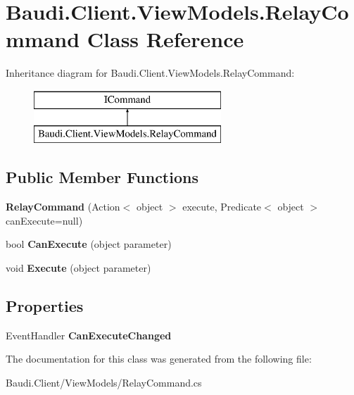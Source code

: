 \hypertarget{class_baudi_1_1_client_1_1_view_models_1_1_relay_command}{}\section{Baudi.\+Client.\+View\+Models.\+Relay\+Command Class Reference}
\label{class_baudi_1_1_client_1_1_view_models_1_1_relay_command}
Inheritance diagram for Baudi.\+Client.\+View\+Models.\+Relay\+Command\+:\begin{figure}[H]
\begin{center}
\leavevmode
\includegraphics[height=2.000000cm]{class_baudi_1_1_client_1_1_view_models_1_1_relay_command}
\end{center}
\end{figure}
\subsection*{Public Member Functions}
\begin{DoxyCompactItemize}
\item 
\hypertarget{class_baudi_1_1_client_1_1_view_models_1_1_relay_command_a3f9ea633fcd312f59116b5c8e725c51b}{}{\bfseries Relay\+Command} (Action$<$ object $>$ execute, Predicate$<$ object $>$ can\+Execute=null)\label{class_baudi_1_1_client_1_1_view_models_1_1_relay_command_a3f9ea633fcd312f59116b5c8e725c51b}

\item 
\hypertarget{class_baudi_1_1_client_1_1_view_models_1_1_relay_command_af1580e2b47363e45821fe7265a945934}{}bool {\bfseries Can\+Execute} (object parameter)\label{class_baudi_1_1_client_1_1_view_models_1_1_relay_command_af1580e2b47363e45821fe7265a945934}

\item 
\hypertarget{class_baudi_1_1_client_1_1_view_models_1_1_relay_command_a54a3e3953dd926f9cc6a1b7969d9a425}{}void {\bfseries Execute} (object parameter)\label{class_baudi_1_1_client_1_1_view_models_1_1_relay_command_a54a3e3953dd926f9cc6a1b7969d9a425}

\end{DoxyCompactItemize}
\subsection*{Properties}
\begin{DoxyCompactItemize}
\item 
\hypertarget{class_baudi_1_1_client_1_1_view_models_1_1_relay_command_a77400ef41bd2e1176ddcb6579ec54e66}{}Event\+Handler {\bfseries Can\+Execute\+Changed}\label{class_baudi_1_1_client_1_1_view_models_1_1_relay_command_a77400ef41bd2e1176ddcb6579ec54e66}

\end{DoxyCompactItemize}


The documentation for this class was generated from the following file\+:\begin{DoxyCompactItemize}
\item 
Baudi.\+Client/\+View\+Models/Relay\+Command.\+cs\end{DoxyCompactItemize}
